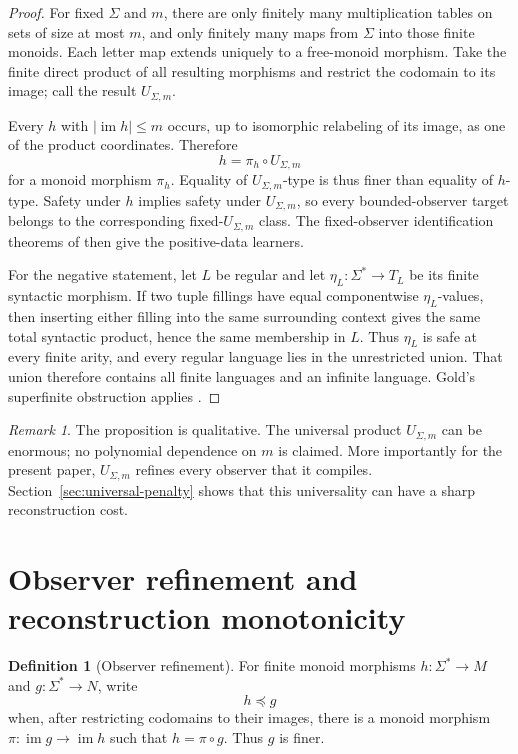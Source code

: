 \documentclass[11pt]{article}
\theoremstyle{definition}
\newtheorem{definition}[theorem]{Definition}
\theoremstyle{remark}
\newtheorem{remark}[theorem]{Remark}
\newcommand{\im}{\operatorname{im}}
\begin{document}
\begin{proof}
For fixed \(\Sigma\) and \(m\), there are only finitely many multiplication
tables on sets of size at most \(m\), and only finitely many maps from
\(\Sigma\) into those finite monoids.  Each letter map extends uniquely to a
free-monoid morphism.  Take the finite direct product of all resulting
morphisms and restrict the codomain to its image; call the result
\(U_{\Sigma,m}\).

Every \(h\) with \(|\im h|\le m\) occurs, up to isomorphic relabeling of its
image, as one of the product coordinates.  Therefore
\[
 h=\pi_h\circ U_{\Sigma,m}
\]
for a monoid morphism \(\pi_h\).  Equality of \(U_{\Sigma,m}\)-type is thus
finer than equality of \(h\)-type.  Safety under \(h\) implies safety under
\(U_{\Sigma,m}\), so every bounded-observer target belongs to the corresponding
fixed-\(U_{\Sigma,m}\) class.  The fixed-observer identification theorems of
\cite{KuriyamaCFG,KuriyamaMCFG} then give the positive-data learners.

For the negative statement, let \(L\) be regular and let
\(\eta_L:\Sigma^*\to T_L\) be its finite syntactic morphism.  If two tuple
fillings have equal componentwise \(\eta_L\)-values, then inserting either
filling into the same surrounding context gives the same total syntactic
product, hence the same membership in \(L\).  Thus \(\eta_L\) is safe at every
finite arity, and every regular language lies in the unrestricted union.
That union therefore contains all finite languages and an infinite language.
Gold's superfinite obstruction applies \cite{Gold1967}.
\end{proof}

\begin{remark}
The proposition is qualitative.  The universal product \(U_{\Sigma,m}\) can
be enormous; no polynomial dependence on \(m\) is claimed.  More importantly
for the present paper, \(U_{\Sigma,m}\) refines every observer that it
compiles.  Section~\ref{sec:universal-penalty} shows that this universality can
have a sharp reconstruction cost.
\end{remark}

\section{Observer refinement and reconstruction monotonicity}
\label{sec:refinement}

\begin{definition}[Observer refinement]
For finite monoid morphisms \(h:\Sigma^*\to M\) and \(g:\Sigma^*\to N\),
write
\[
 h\preceq g
\]
when, after restricting codomains to their images, there is a monoid morphism
\(\pi:\im g\to\im h\) such that \(h=\pi\circ g\).  Thus \(g\) is finer.
\end{definition}
\end{document}
